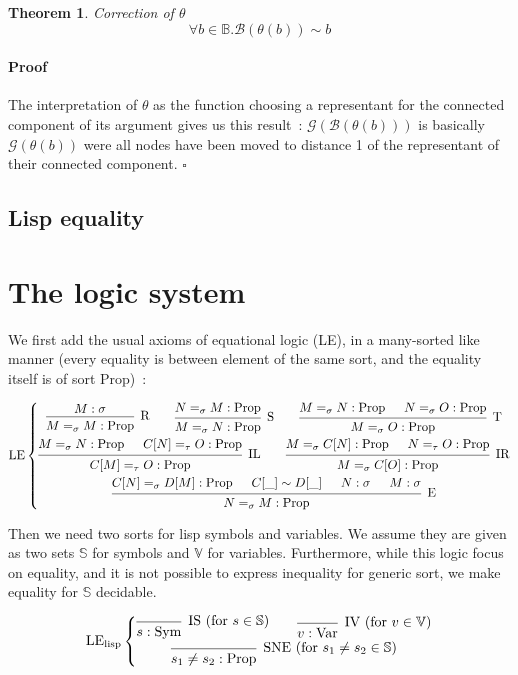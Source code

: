 \documentclass[]{article}
\newcommand{\B}{\mathscr{B}}
\newcommand{\G}{\mathscr{G}}
\newcommand{\V}{\mathscr{V}}
\newcommand{\1}{\mathbbm{1}}
\newcommand{\0}{\mathbbm{0}}
\renewcommand{\S}{\mathbb{S}}
\renewcommand{\V}{\mathbb{V}}
\newtheorem{theo}{Theorem}
\newenvironment{prf}{\paragraph{Proof}}{\hfill$\square$}
\newcommand{\Prop}{\text{Prop}}
\newcommand{\Sym}{\text{Sym}}
\newcommand{\Var}{\text{Var}}
\newcommand{\proof}[1]{{\scantokens{\begin{prooftree}#1\end{prooftree}}}}
\begin{document}
\begin{theo}{Correction of $\theta$}
    \[ \forall b\in\mathbb{B}. \B(\theta(b)) \sim b \]
\end{theo}
\begin{prf}
    The interpretation of $\theta$ as the function choosing a representant for the
    connected component of its argument gives us this result~: $\G(\B(\theta(b)))$ is
    basically $\G(\theta(b))$ were all nodes have been moved to distance 1 of the
    representant of their connected component.
\end{prf}

\subsection{Lisp equality}


\section{The logic system}

We first add the usual axioms of equational logic (LE),
in a many-sorted like manner (every equality is between element
of the same sort, and the equality itself is of sort $\Prop$)~:

\[\text{LE}\left\{
\begin{gathered}
\proof{
    \hypo{M : \sigma}
    \infer1[R]{M =_\sigma M : \Prop}
}
\qquad\proof{
    \hypo{ N =_\sigma M : \Prop }
    \infer1[S]{M =_\sigma N : \Prop}
}
\qquad\proof{
    \hypo{M=_\sigma N : \Prop}
    \hypo{N=_\sigma O : \Prop}
    \infer2[T]{M=_\sigma O : \Prop}
} \\
\proof{
    \hypo{M=_\sigma N:\Prop}
    \hypo{C[N]=_\tau O:\Prop}
    \infer2[IL]{C[M]=_\tau O : \Prop}
}
\qquad\proof{
    \hypo{M =_\sigma C[N]:\Prop}
    \hypo{N =_\tau O:\Prop}
    \infer2[IR]{M =_\sigma C[O]:\Prop}
} \\
\proof{
    \hypo{C[N]=_\sigma D[M]:\Prop}
    \hypo{C[\_]\sim D[\_]}
    \hypo{N:\sigma}
    \hypo{M:\sigma}
    \infer4[E]{N=_\sigma M:\Prop}
}
\end{gathered}
\right.
\]

Then we need two sorts for lisp symbols and variables. We assume they
are given as two sets $\S$ for symbols and $\V$ for variables.
Furthermore, while this logic focus on equality, and it is not possible
to express inequality for generic sort, we make equality for $\S$
decidable.

\[\text{LE}_\text{lisp}\left\{
    \begin{gathered}
        \proof{
            \infer0[IS (for $s\in\S$)]{s : \Sym}
        }
        \qquad\proof{
            \infer0[IV (for $v\in\V)$]{v : \Var}
        }\\
        \proof{
            \infer0[SNE (for $s_1\neq s_2\in\S$)]{s_1\neq s_2:\Prop}
        }
    \end{gathered}
\right.\]
\end{document}
